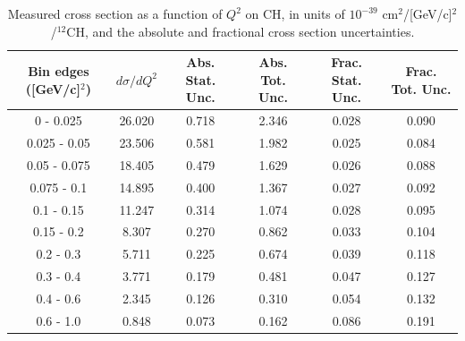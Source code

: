 \documentclass[aps,prl,twocolumn,superscriptaddress,nofootinbib]{revtex4-1}
\begin{document}
\begin{table}[h!]
  \centering
  \caption{Measured cross section as a function of $Q^{2}$ on CH, in units of
  $10^{-39}$ $\text{cm}^{2}$/[GeV/c]$^{2}$/$^{12}$CH, and the absolute and
  fractional cross section uncertainties.}
    \begin{tabular}{c||c||c|c||c|c}
      Bin edges ([GeV/c]$^{2}$)  &  $d\sigma/dQ^{2}$  &  Abs. Stat. Unc. & Abs. Tot. Unc.  &  Frac. Stat. Unc.  &  Frac. Tot. Unc. \\
      \hline\hline
         0 - 0.025 & 26.020 & 0.718 & 2.346 & 0.028 & 0.090 \\
      0.025 - 0.05 & 23.506 & 0.581 & 1.982 & 0.025 & 0.084 \\
      0.05 - 0.075 & 18.405 & 0.479 & 1.629 & 0.026 & 0.088 \\
       0.075 - 0.1 & 14.895 & 0.400 & 1.367 & 0.027 & 0.092 \\
        0.1 - 0.15 & 11.247 & 0.314 & 1.074 & 0.028 & 0.095 \\
        0.15 - 0.2 & 8.307 & 0.270 & 0.862 & 0.033 & 0.104 \\
         0.2 - 0.3 & 5.711 & 0.225 & 0.674 & 0.039 & 0.118 \\
         0.3 - 0.4 & 3.771 & 0.179 & 0.481 & 0.047 & 0.127 \\
         0.4 - 0.6 & 2.345 & 0.126 & 0.310 & 0.054 & 0.132 \\
         0.6 - 1.0 & 0.848 & 0.073 & 0.162 & 0.086 & 0.191 \\
    \end{tabular}
  \label{table:Q2XSec_CH}
\end{table}
\end{document}
